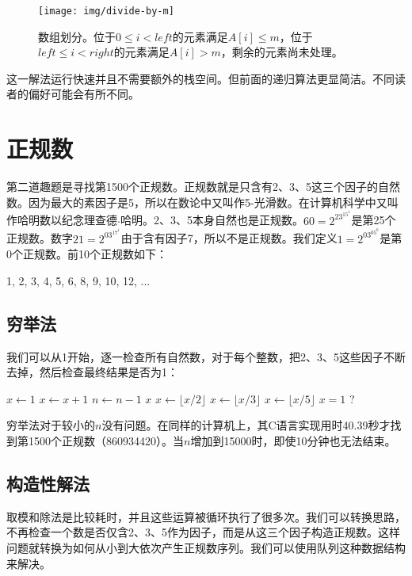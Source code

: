 \documentclass[b5paper]{ctexart}
\begin{document}
\begin{figure}[htbp]
  \centering
  \texttt{[image: img/divide-by-m]}
  \caption{数组划分。位于$0 \leq i < left$的元素满足$A[i] \leq m$，位于$left \leq i < right$的元素满足$A[i] > m$，剩余的元素尚未处理。}
  \label{fig:divide}
\end{figure}

这一解法运行快速并且不需要额外的栈空间。但前面的递归算法更显简洁。不同读者的偏好可能会有所不同。

\section{正规数}

第二道趣题是寻找第1500个正规数。正规数就是只含有2、3、5这三个因子的自然数。因为最大的素因子是5，所以在数论中又叫作5-光滑数。在计算机科学中又叫作哈明数以纪念理查德$\cdot$哈明。2、3、5本身自然也是正规数。$60 = 2^23^15^1$是第25个正规数。数字$21 = 2^03^17^1$由于含有因子7，所以不是正规数。我们定义$1=2^03^05^0$是第0个正规数。前10个正规数如下：

1, 2, 3, 4, 5, 6, 8, 9, 10, 12, ...

\subsection{穷举法}
我们可以从1开始，逐一检查所有自然数，对于每个整数，把2、3、5这些因子不断去掉，然后检查最终结果是否为1：

\begin{algorithmic}[1]
  \State $x \gets 1$
    \State $x \gets x + 1$
      \State $n \gets n - 1$
    \EndIf
  \EndWhile
  \State \Return $x$
\EndFunction
\Statex
{}
    \State $x \gets \lfloor x / 2 \rfloor$
  \EndWhile
    \State $x \gets \lfloor x / 3 \rfloor$
  \EndWhile
    \State $x \gets \lfloor x / 5 \rfloor$
  \EndWhile
  \State \Return $x = 1$ ?
\EndFunction
\end{algorithmic}

穷举法对于较小的$n$没有问题。在同样的计算机上，其C语言实现用时40.39秒才找到第1500个正规数（860934420）。当$n$增加到15000时，即使10分钟也无法结束。

\subsection{构造性解法}
取模和除法是比较耗时\cite{Bentley}，并且这些运算被循环执行了很多次。我们可以转换思路，不再检查一个数是否仅含2、3、5作为因子，而是从这三个因子构造正规数。这样问题就转换为如何从小到大依次产生正规数序列。我们可以使用队列这种数据结构来解决。
\end{document}
